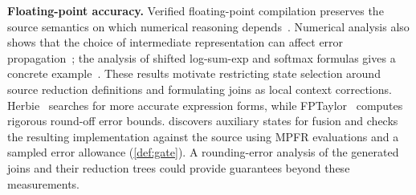 \textbf{Floating-point accuracy.}
Verified floating-point compilation preserves the source semantics on which numerical reasoning depends~\citep{boldo_fp}.
Numerical analysis also shows that the choice of intermediate representation can affect error propagation~\citep{higham_decomposition}; the analysis of shifted log-sum-exp and softmax formulas gives a concrete example~\citep{blanchard}.
These results motivate restricting state selection around source reduction definitions and formulating joins as local context corrections.
Herbie~\citep{herbie} searches for more accurate expression forms, while FPTaylor~\citep{fptaylor} computes rigorous round-off error bounds.
\sys discovers auxiliary states for fusion and checks the resulting implementation against the source using MPFR evaluations and a sampled error allowance (\cref{def:gate}).
A rounding-error analysis of the generated joins and their reduction trees could provide guarantees beyond these measurements.
